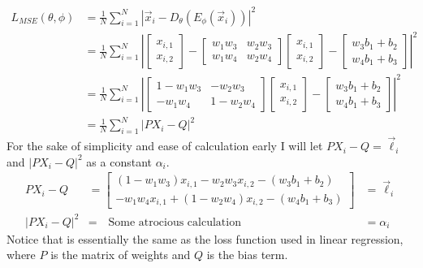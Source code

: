 \documentclass[answers,12pt,addpoints]{exam}
\begin{document}
\begin{align*}
    L_{MSE}(\theta, \phi) &= \frac{1}{N} \sum_{i=1}^{N} |\vec{x}_i - D_\theta(E_\phi(\vec{x}_i))|^2 \\
    &= \frac{1}{N} \sum_{i=1}^{N} \left| \begin{bmatrix}
        x_{i,1} \\
        x_{i,2}
    \end{bmatrix} - \begin{bmatrix}
        w_1 w_3 & w_2 w_3\\
        w_1 w_4 & w_2 w_4
    \end{bmatrix} \begin{bmatrix}
        x_{i,1} \\
        x_{i,2}
    \end{bmatrix} - \begin{bmatrix}
        w_3b_1 + b_2 \\
        w_4b_1 + b_3
    \end{bmatrix} \right|^2 \\
    &= \frac{1}{N} \sum_{i=1}^{N} \left| \begin{bmatrix} 
        1 - w_1 w_3& -w_2 w_3\\
        -w_1 w_4 & 1 - w_2 w_4
    \end{bmatrix} \begin{bmatrix}
        x_{i,1} \\
        x_{i,2}
    \end{bmatrix} - \begin{bmatrix}
        w_3b_1 + b_2 \\
        w_4b_1 + b_3
    \end{bmatrix} \right|^2 \\
    &= \frac{1}{N} \sum_{i=1}^{N} \left| P X_i - Q \right|^2 
\end{align*}
For the sake of simplicity and ease of calculation early I will let $PX_i-Q = \vec{\ell}_i$ and $|PX_i-Q|^2$ as a constant $\alpha_i$.
\begin{align*}
    PX_i - Q &= \begin{bmatrix}
    (1-w_1 w_3)x_{i,1} - w_2 w_3 x_{i,2} - (w_3b_1 + b_2) \\
    -w_1 w_4 x_{i,1} + (1-w_2 w_4)x_{i,2} - (w_4b_1 + b_3)
    \end{bmatrix} &= \vec{\ell}_i\\
    |PX_i - Q|^2 &= \quad \text{Some atrocious calculation} &= \alpha_i
\end{align*}
Notice that is essentially the same as the loss function used in linear regression, where $P$ is the matrix of weights and $Q$ is the bias term. \\
\end{document}
